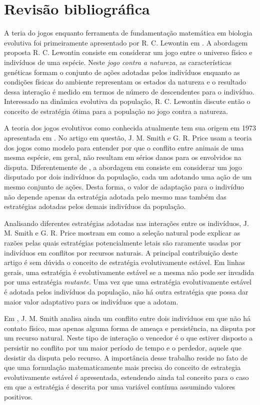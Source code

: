 \documentclass[
	12pt,				%
	openany,			%
	oneoside,			%
	a4paper,			%
	english,			%
	spanish,			%
	brazil,				%
	]{abntex2}
\begin{document}
\chapter{Revisão bibliográfica}

A teria do jogos enquanto ferramenta de fundamentação matemática em biologia evolutiva foi primeiramente apresentado por R. C. Lewontin em \cite{Lewontin1961382}.  A abordagem proposta R. C. Lewontin consiste em considerar um jogo entre o universo físico e indivíduos de uma espécie. Neste \textit{jogo contra a natureza}, as características genéticas formam o conjunto de ações adotadas pelos indivíduos  enquanto as condições físicas do ambiente representam os estados da natureza e o resultado dessa interação é medido em termos de número de descendentes para o indivíduo.  Interessado na dinâmica evolutiva da população,  R. C. Lewontin discute então o conceito de estratégia ótima para a população no jogo contra a natureza.        


A teoria dos jogos evolutivos como conhecida atualmente tem sua origem em 1973 apresentada em \cite{MaynardSmith1973}. No artigo em questão, J. M. Smith e G. R. Price usam a teoria dos jogos como modelo para entender por que o conflito entre animais de uma mesma espécie, em geral, não resultam em sérios danos para os envolvidos na disputa.  Diferentemente de \cite{Lewontin1961382}, a abordagem em  \cite{MaynardSmith1973} consiste em considerar um jogo disputado por dois indivíduos da população, cada um adotando uma ação de um mesmo conjunto de ações. Desta forma, o valor de adaptação para o indivíduo não depende apenas da estratégia adotada pelo mesmo mas também das estratégias adotadas pelos demais indivíduos da população. 


Analisando diferentes estratégias adotadas nas interações entre os indivíduos, J. M. Smith e G. R. Price mostram em \cite{MaynardSmith1973} como a seleção natural pode explicar as razões pelas quais estratégias potencialmente letais são  raramente usadas por indivíduos em conflitos por recursos naturais. A principal contribuição deste artigo é sem dúvida o conceito de estratégia evolutivamente estável. Em linhas gerais, uma estratégia é evolutivamente estável se a mesma não pode ser invadida por uma estratégia \textit{mutante}. Uma vez que uma estratégia evolutivamente estável é adotada pelos indivíduos da população, não há outra estratégia que possa dar maior valor adaptativo para os indivíduos que a adotam. 

Em \cite{MaynardSmith1974209}, J. M. Smith analisa ainda um conflito entre dois indivíduos em que não há contato físico, mas apenas alguma forma de ameaça e persistência, na disputa por um recurso natural. Neste tipo de interação o vencedor é o que estiver disposto a persistir no conflito por um maior período de tempo e o perdedor, aquele que desistir da disputa pelo recurso. A importância desse trabalho reside  no fato de que uma formulação matematicamente mais precisa do conceito de estrategia evolutivamente estável é apresentada, estendendo ainda tal conceito para o caso em que a estratégia é descrita por uma variável contínua assumindo valores positivos.  
\end{document}
